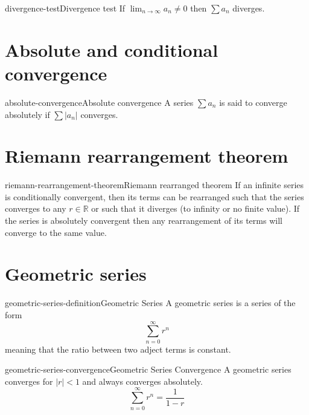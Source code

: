 \documentclass[preview]{standalone}
\begin{document}
\begin{snippettheorem}{divergence-test}{Divergence test}
    If \(\lim_{n \to \infty} a_n \neq 0\) then \(\sum a_n\) diverges.
\end{snippettheorem}

\section{Absolute and conditional convergence}

\begin{snippetdefinition}{absolute-convergence}{Absolute convergence}
    A series \(\sum a_n\) is said to converge absolutely if
    \(\sum |a_n|\) converges.
\end{snippetdefinition}



\section{Riemann rearrangement theorem}

\begin{snippettheorem}{riemann-rearrangement-theorem}{Riemann rearranged theorem}
    If an infinite series is conditionally convergent, then its terms can be rearranged such that
    the series converges to any \(r\in \mathbb{R}\) or such that it diverges (to infinity or no finite value).
    If the series is absolutely convergent then any rearrangement of its terms will converge to the same value.
\end{snippettheorem}

\section{Geometric series}

\begin{snippetdefinition}{geometric-series-definition}{Geometric Series}
    A geometric series is a series of the form
    \[
        \sum_{n=0}^\infty r^n
    \]
    meaning that the ratio between two adject terms is constant.
\end{snippetdefinition}

\begin{snippettheorem}{geometric-series-convergence}{Geometric Series Convergence}
    A geometric series converges for \(|r| < 1\) and always converges absolutely.
    \[
        \sum_{n=0}^\infty r^n = \frac{1}{1-r}
    \]
\end{snippettheorem}
\end{document}
